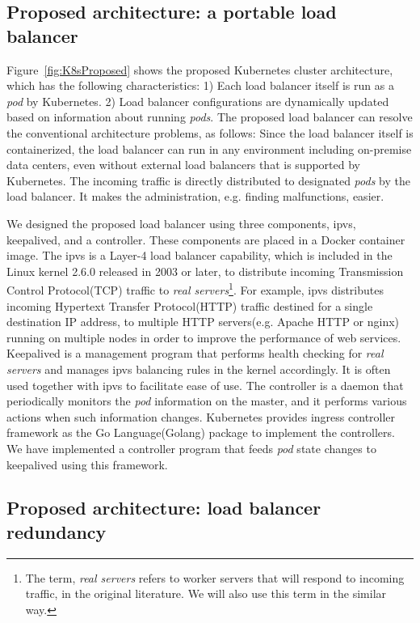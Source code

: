 \subsection{Proposed architecture: a portable load balancer}

Figure~\ref{fig:K8sProposed} shows the proposed  Kubernetes cluster architecture, 
which has the following characteristics:
1) Each load balancer itself is run as a {\em pod} by Kubernetes. 
2) Load balancer configurations are dynamically updated based on information about running {\em pods}.
The proposed load balancer can resolve the conventional architecture problems, as follows:
Since the load balancer itself is containerized, the load balancer can run in any environment including on-premise data centers, 
even without external load balancers that is supported by Kubernetes.
The incoming traffic is directly distributed to designated {\em pods} by the load balancer. 
It makes the administration, e.g. finding malfunctions, easier.

We designed the proposed load balancer using three components, ipvs, keepalived, and a controller. 
These components are placed in a Docker container image.
The ipvs is a Layer-4 load balancer capability, which is included in the Linux kernel 2.6.0 released in 2003 or later, 
to distribute incoming Transmission Control Protocol(TCP) traffic to 
{\em real servers}\footnote{The term, {\em real servers} refers to worker servers that will respond to incoming traffic, 
in the original literature\cite{Zhang2000}. We will also use this term in the similar way.}\cite{Zhang2000}. 
For example, ipvs distributes incoming Hypertext Transfer Protocol(HTTP) traffic destined for a single destination IP address, 
to multiple HTTP servers(e.g. Apache HTTP or nginx) running on multiple nodes in order to improve the performance of web services.
Keepalived is a management program that performs health checking for {\em real servers}
and manages ipvs balancing rules in the kernel accordingly.
It is often used together with ipvs to facilitate ease of use.
The controller is a daemon that periodically monitors the {\em pod} information on the master, 
and it performs various actions when such information changes.
Kubernetes provides ingress controller framework as the Go Language(Golang) package to implement the controllers. 
We have implemented a controller program that feeds {\em pod} state changes to keepalived 
using this framework. 

\subsection{Proposed architecture: load balancer redundancy}

